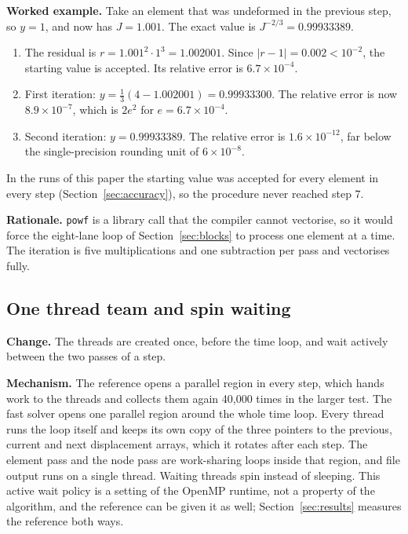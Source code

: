\documentclass[11pt,a4paper]{article}
\newcommand{\code}[1]{\texttt{#1}}
\newcommand{\Jm}{J^{-2/3}}
\begin{document}
\textbf{Worked example.} Take an element that was undeformed in the previous step, so $y = 1$, and now has $J = 1.001$. The exact value is $\Jm = 0.99933389$.
\begin{enumerate}
\item The residual is $r = 1.001^2 \cdot 1^3 = 1.002001$. Since $|r - 1| = 0.002 < 10^{-2}$, the starting value is accepted. Its relative error is $6.7\times10^{-4}$.
\item First iteration: $y = \tfrac{1}{3}(4 - 1.002001) = 0.99933300$. The relative error is now $8.9\times10^{-7}$, which is $2e^2$ for $e = 6.7\times10^{-4}$.
\item Second iteration: $y = 0.99933389$. The relative error is $1.6\times10^{-12}$, far below the single-precision rounding unit of $6\times10^{-8}$.
\end{enumerate}
In the runs of this paper the starting value was accepted for every element in every step (Section~\ref{sec:accuracy}), so the procedure never reached step 7.

\textbf{Rationale.} \code{powf} is a library call that the compiler cannot vectorise, so it would force the eight-lane loop of Section~\ref{sec:blocks} to process one element at a time. The iteration is five multiplications and one subtraction per pass and vectorises fully.

\subsection{One thread team and spin waiting}
\label{sec:threads}

\textbf{Change.} The threads are created once, before the time loop, and wait actively between the two passes of a step.

\textbf{Mechanism.} The reference opens a parallel region in every step, which hands work to the threads and collects them again 40,000 times in the larger test. The fast solver opens one parallel region around the whole time loop. Every thread runs the loop itself and keeps its own copy of the three pointers to the previous, current and next displacement arrays, which it rotates after each step. The element pass and the node pass are work-sharing loops inside that region, and file output runs on a single thread. Waiting threads spin instead of sleeping. This active wait policy is a setting of the OpenMP runtime, not a property of the algorithm, and the reference can be given it as well; Section~\ref{sec:results} measures the reference both ways.
\end{document}

